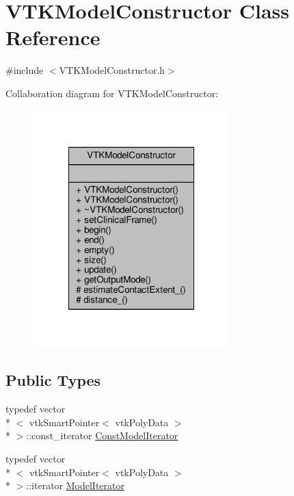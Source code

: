 \hypertarget{classVTKModelConstructor}{\section{V\-T\-K\-Model\-Constructor Class Reference}
\label{classVTKModelConstructor}
}


{\ttfamily \#include $<$V\-T\-K\-Model\-Constructor.\-h$>$}



Collaboration diagram for V\-T\-K\-Model\-Constructor\-:
\nopagebreak
\begin{figure}[H]
\begin{center}
\leavevmode
\includegraphics[width=216pt]{classVTKModelConstructor__coll__graph}
\end{center}
\end{figure}
\subsection*{Public Types}
\begin{DoxyCompactItemize}
\item 
typedef vector\\*
$<$ vtk\-Smart\-Pointer$<$ vtk\-Poly\-Data $>$\\*
 $>$\-::const\-\_\-iterator \hyperlink{classVTKModelConstructor_a439d0cca160eb72fc54c6727c69cbb5a}{Const\-Model\-Iterator}
\item 
typedef vector\\*
$<$ vtk\-Smart\-Pointer$<$ vtk\-Poly\-Data $>$\\*
 $>$\-::iterator \hyperlink{classVTKModelConstructor_a8ab5ac1866904faee9e4120b07f63701}{Model\-Iterator}
\end{DoxyCompactItemize}
